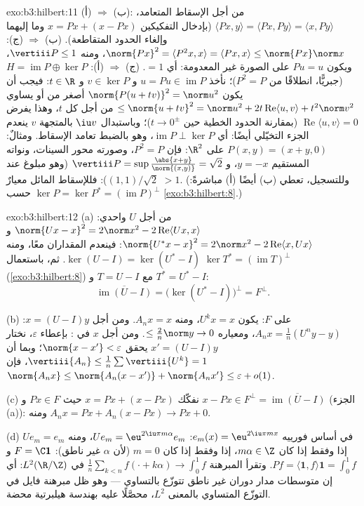 \begin{solution}{exo:b3:hilbert:11}
(أ) $\Rightarrow$ (ب): من أجل الإسقاط المتعامد، $\langle Px, y\rangle = \langle Px, Py\rangle = \langle x,
Py\rangle$ (بإدخال
التفكيكين $x = Px + (x - Px)$ وما إليهما وإلغاء الحدود المتقاطعة).
(ب) $\Rightarrow$ (ج): $\norm{Px}^2 = \langle P^2x, x\rangle = \langle Px, x\rangle
\leq \norm{Px}\norm x$، ومنه $\vertiii P \leq 1$، ويكون $Pu = u$
على الصورة غير المعدومة: أي $= 1$. (ج) $\Rightarrow$ (أ):
$H =
\operatorname{im}P \oplus \ker P$ (جبريًّا، انطلاقًا من $P^2
= P$)؛ نأخذ $u = Pu \in \operatorname{im}P$
و $v \in \ker P$ و $t \in \R$: فيجب أن يكون $\norm{P(u + tv)}^2 = \norm u^2$ أصغر من أو
يساوي $\leq
\norm{u + tv}^2 = \norm u^2 + 2t\operatorname{Re}\langle u,
v\rangle + t^2\norm v^2$ من أجل كل $t$، وهذا يفرض $\operatorname{Re}\langle u, v\rangle = 0$ (بمقارنة الحدود
الخطية حين $t \to 0^\pm$)؛ وباستبدال $\iu v$ بالمتجهة $v$ ينعدم
الجزء التخيّلي أيضًا: أي $\operatorname{im}P \perp
\ker P$، وهو بالضبط تعامد الإسقاط.
ومثالٌ: $P(x, y) = (x + y, 0)$ على $\R^2$: فإن $P^2 = P$، وصورته محور
السينات، ونواته المستقيم $y = -x$، و
$\vertiii P = \sup\frac{\abs{x+y}}{\norm{(x,y)}} = \sqrt2$
(وهو مبلوغ عند $(1,1)/\sqrt2$): فللإسقاط المائل معيارٌ $> 1$.
(وللتسجيل، تعطي (ب) أيضًا (أ) مباشرةً: $\ker P = \ker P^* = (\operatorname{im}P)^\perp$ حسب
\cref{exo:b3:hilbert:8}.)
\end{solution}

\begin{solution}{exo:b3:hilbert:12}
(a) من أجل $U$ واحدي: $\norm{Ux - x}^2 = 2\norm x^2 -
2\operatorname{Re}\langle Ux, x\rangle$ و $\norm{U^*x -
x}^2 = 2\norm x^2 - 2\operatorname{Re}\langle x, Ux\rangle$: فينعدم المقداران معًا،
ومنه $\ker(U - I) = \ker(U^* - I)$. ثم، باستعمال $\ker T^* = (\operatorname{im}T)^\perp$ (\cref{exo:b3:hilbert:8}) مع $T = U - I$
و $T^* = U^* -
I$:
\[
\overline{\operatorname{im}(U - I)} = \bigl(\ker(U^* -
I)\bigr)^\perp = F^\perp .
\]

(b) على $F$: يكون $U^kx = x$، ومنه $A_nx = x$. ومن أجل
$x = (U - I)y$: $A_nx = \frac1n(U^ny - y)$، ومعياره $\leq \frac2n\norm y \to
0$. ومن أجل $x$ في :
بإعطاء $\varepsilon$، نختار $x' =
(U - I)y$ يحقق $\norm{x - x'} < \varepsilon$؛ وبما أن
$\vertiii{A_n} \leq \frac1n\sum\vertiii{U^k} = 1$، فإن $\norm{A_nx} \leq \norm{A_n(x - x')} + \norm{A_nx'} \leq
\varepsilon + o(1)$.

(c) نفكّك $x = Px + (x - Px)$ حيث $Px \in F$ و $x -
Px \in F^\perp = \overline{\operatorname{im}(U - I)}$ (الجزء (a)): ومنه
$A_nx = Px + A_n(x - Px) \to Px + 0$.

(d) في أساس فورييه $e_m(x) = \eu^{2\iu\pi mx}$: $Ue_m
= \eu^{2\iu\pi m\alpha}e_m$، ومنه $Ue_m = e_m$ إذا
وفقط إذا كان $m\alpha
\in \Z$، إذا وفقط إذا كان $m = 0$ (لأن $\alpha$
غير ناطق): $F = \C\mathbf 1$ و $Pf = \langle\mathbf 1, f\rangle\mathbf 1 = \int_0^1f$. وتقرأ المبرهنة $\frac1n\sum_{k<n}f(\cdot + k\alpha) \to
\int_0^1f$ في
$L^2(\R/\Z)$: أي إن متوسطات مدار دوران غير ناطق تتوزّع
بالتساوي --- وهو ظل مبرهنة فايل في التوزّع المتساوي بالمعنى
$L^2$، محصَّلًا عليه بهندسة هيلبرتية محضة.
\end{solution}

